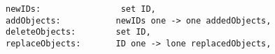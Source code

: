 \lstset{frame=tb, aboveskip=12pt, belowskip=-3pt, breaklines=true, basicstyle=\small\ttfamily, tabsize=2, mathescape=true}
\begin{lstlisting}[caption={base\_deltas.als, lines 13-17}, label=alloy:deltainputs, captionpos=b]
newIDs:                set ID,
addObjects:           newIDs one -> one addedObjects,
deleteObjects:        set ID,
replaceObjects:       ID one -> lone replacedObjects,
\end{lstlisting}
